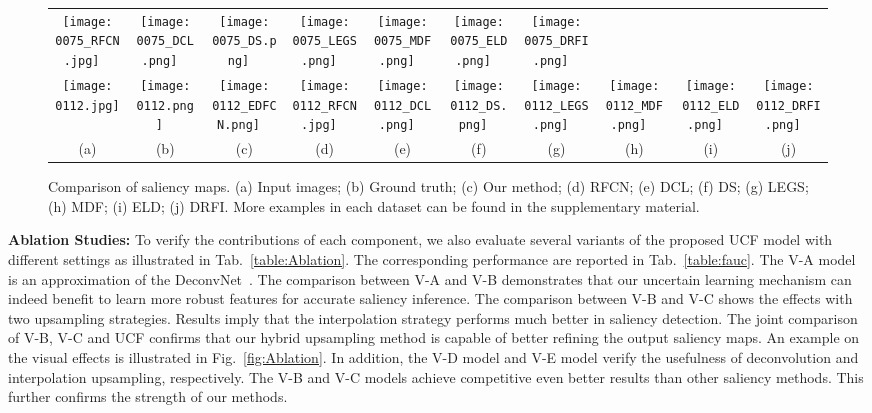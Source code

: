 \documentclass[10pt,twocolumn,letterpaper]{article}
\begin{document}
\begin{figure*}
\begin{tabular}{@{}c@{}c@{}c@{}c@{}c@{}c@{}c@{}c@{}c@{}c}
\texttt{[image: 0075\_RFCN.jpg]} \ &
\texttt{[image: 0075\_DCL.png]} \ &
\texttt{[image: 0075\_DS.png]} \ &
\texttt{[image: 0075\_LEGS.png]} \ &
\texttt{[image: 0075\_MDF.png]} \ &
\texttt{[image: 0075\_ELD.png]} \ &
\texttt{[image: 0075\_DRFI.png]} \ \\
\vspace{-1mm}
\texttt{[image: 0112.jpg]} \ &
\texttt{[image: 0112.png]} \ &
\texttt{[image: 0112\_EDFCN.png]} \ &
\texttt{[image: 0112\_RFCN.jpg]} \ &
\texttt{[image: 0112\_DCL.png]} \ &
\texttt{[image: 0112\_DS.png]} \ &
\texttt{[image: 0112\_LEGS.png]} \ &
\texttt{[image: 0112\_MDF.png]} \ &
\texttt{[image: 0112\_ELD.png]} \ &
\texttt{[image: 0112\_DRFI.png]} \ \\
{\small (a)} & {\small(b)} & {\small(c)} & {\small(d)} & {\small(e)}& {\small(f)}& {\small(g)}
& {\small(h)}& {\small(i)}& {\small(j)} \\
\end{tabular}
\caption{Comparison of saliency maps. (a) Input images; (b) Ground truth; (c) Our method; (d) RFCN; (e) DCL; (f) DS; (g) LEGS; (h) MDF; (i) ELD; (j) DRFI. More examples in each dataset can be found in the supplementary material.
\label{fig:map_examples}}
\vspace{-6mm}
\end{figure*}
{\flushleft\textbf{Ablation Studies:}} To verify the contributions of each component, we also evaluate several variants of the proposed UCF model with different settings as illustrated in Tab.~\ref{table:Ablation}.
The corresponding performance are reported in Tab.~\ref{table:fauc}.
The V-A model is an approximation of the DeconvNet~\cite{noh2015learning}.
The comparison between V-A and V-B demonstrates that our uncertain learning mechanism can indeed benefit to learn more robust features for accurate saliency inference.
The comparison between V-B and V-C shows the effects with two upsampling strategies.
Results imply that the interpolation strategy performs much better in saliency detection.
The joint comparison of V-B, V-C and UCF confirms that our hybrid upsampling method is capable of
better refining the output saliency maps.
An example on the visual effects is illustrated in Fig.~\ref{fig:Ablation}.
In addition, the V-D model and V-E model verify the usefulness of deconvolution and interpolation upsampling, respectively.
The V-B and V-C models achieve competitive even better results than other saliency methods. This further confirms the strength of our methods.
\vspace{-2mm}
\end{document}
